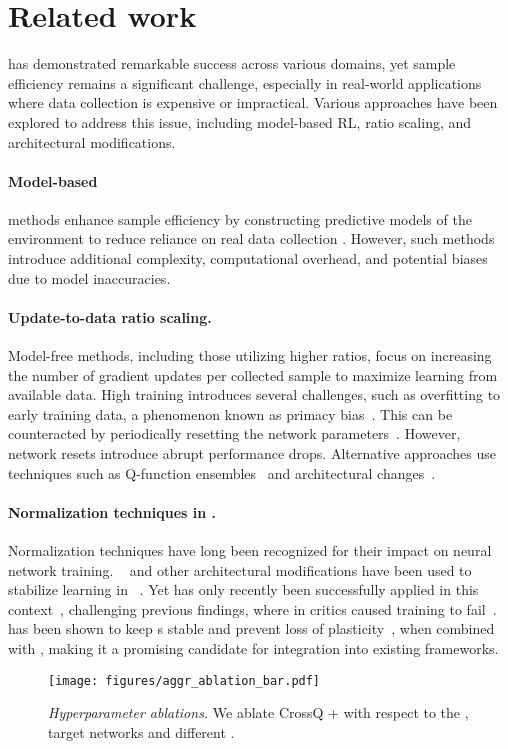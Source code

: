 \section{Related work}
\RL{} has demonstrated remarkable success across various domains, yet sample efficiency remains a significant challenge, especially in real-world applications where data collection is expensive or impractical. Various approaches have been explored to address this issue, including model-based RL, \UTD{} ratio scaling, and architectural modifications.

\paragraph{Model-based \RL{}} methods enhance sample efficiency by constructing predictive models of the environment to reduce reliance on real data collection \cite{sutton1990dynaQ,janner2019mbpo,feinberg2018mve,heess2015svg}.
However, such methods introduce additional complexity, computational overhead, and potential biases due to model inaccuracies.

\paragraph{Update-to-data ratio scaling.}
Model-free \RL{} methods, including those utilizing higher \UTD{} ratios, focus on increasing the number of gradient updates per collected sample to maximize learning from available data.
High \UTD{} training introduces several challenges, such as overfitting to early training data, a phenomenon known as primacy bias~\citep{nikishin2022primacy}.
This can be counteracted by periodically resetting the network parameters~\citep{nikishin2022primacy,doro2022replaybarrier}.
However, network resets introduce abrupt performance drops.
Alternative approaches use techniques such as Q-function ensembles~\citep{chen2021redq,hiraoka2021droq} and architectural changes~\citep{nauman2024bigger}.

\paragraph{Normalization techniques in \RL{}.}
Normalization techniques have long been recognized for their impact on neural network training. \LN{}~\citep{ba2016layernorm} and other architectural modifications have been used to stabilize learning in \RL{}~\citep{hiraoka2021droq,nauman2024bigger}.
Yet \BN{} has only recently been successfully applied in this context~\citep{bhatt2024crossq}, challenging previous findings, where \BN{} in critics caused training to fail~\citep{hiraoka2021droq}.
\WN{} has been shown to keep \ELR{}s stable and prevent loss of plasticity~\cite{lyle2024normalization}, when combined with \LN{}, making it a promising candidate for integration into existing \RL{} frameworks.

\begin{figure}[t]
    \centering
    \texttt{[image: figures/aggr\_ablation\_bar.pdf]}
    \caption{\textit{Hyperparameter ablations.}
    We ablate CrossQ + \WN{} with respect to the \WN{}, target networks and different \UTD.
    }
    \label{fig:ablations}
\end{figure}
